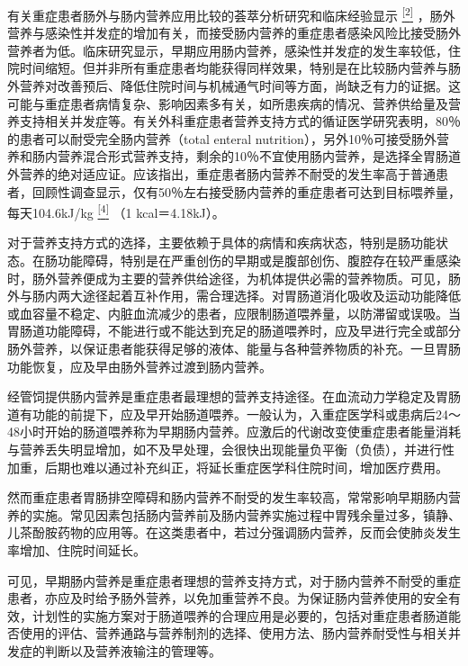 有关重症患者肠外与肠内营养应用比较的荟萃分析研究和临床经验显示
\protect\hyperlink{text00028.htmlux5cux23ch2-27}{\textsuperscript{{[}2{]}}}
，肠外营养与感染性并发症的增加有关，而接受肠内营养的重症患者感染风险比接受肠外营养者为低。临床研究显示，早期应用肠内营养，感染性并发症的发生率较低，住院时间缩短。但并非所有重症患者均能获得同样效果，特别是在比较肠内营养与肠外营养对改善预后、降低住院时间与机械通气时间等方面，尚缺乏有力的证据。这可能与重症患者病情复杂、影响因素多有关，如所患疾病的情况、营养供给量及营养支持相关并发症等。有关外科重症患者营养支持方式的循证医学研究表明，80％的患者可以耐受完全肠内营养（total
enteral
nutrition），另外10％可接受肠外营养和肠内营养混合形式营养支持，剩余的10％不宜使用肠内营养，是选择全胃肠道外营养的绝对适应证。应该指出，重症患者肠内营养不耐受的发生率高于普通患者，回顾性调查显示，仅有50％左右接受肠内营养的重症患者可达到目标喂养量，每天104.6kJ/kg
\protect\hyperlink{text00028.htmlux5cux23ch4-27}{\textsuperscript{{[}4{]}}}
（1 kcal＝4.18kJ）。

对于营养支持方式的选择，主要依赖于具体的病情和疾病状态，特别是肠功能状态。在肠功能障碍，特别是在严重创伤的早期或是腹部创伤、腹腔存在较严重感染时，肠外营养便成为主要的营养供给途径，为机体提供必需的营养物质。可见，肠外与肠内两大途径起着互补作用，需合理选择。对胃肠道消化吸收及运动功能降低或血容量不稳定、内脏血流减少的患者，应限制肠道喂养量，以防滞留或误吸。当胃肠道功能障碍，不能进行或不能达到充足的肠道喂养时，应及早进行完全或部分肠外营养，以保证患者能获得足够的液体、能量与各种营养物质的补充。一旦胃肠功能恢复，应及早由肠外营养过渡到肠内营养。

经管饲提供肠内营养是重症患者最理想的营养支持途径。在血流动力学稳定及胃肠道有功能的前提下，应及早开始肠道喂养。一般认为，入重症医学科或患病后24～48小时开始的肠道喂养称为早期肠内营养。应激后的代谢改变使重症患者能量消耗与营养丢失明显增加，如不及早处理，会很快出现能量负平衡（负债），并进行性加重，后期也难以通过补充纠正，将延长重症医学科住院时间，增加医疗费用。

然而重症患者胃肠排空障碍和肠内营养不耐受的发生率较高，常常影响早期肠内营养的实施。常见因素包括肠内营养前及肠内营养实施过程中胃残余量过多，镇静、儿茶酚胺药物的应用等。在这类患者中，若过分强调肠内营养，反而会使肺炎发生率增加、住院时间延长。

可见，早期肠内营养是重症患者理想的营养支持方式，对于肠内营养不耐受的重症患者，亦应及时给予肠外营养，以免加重营养不良。为保证肠内营养使用的安全有效，计划性的实施方案对于肠道喂养的合理应用是必要的，包括对重症患者肠道能否使用的评估、营养通路与营养制剂的选择、使用方法、肠内营养耐受性与相关并发症的判断以及营养液输注的管理等。


